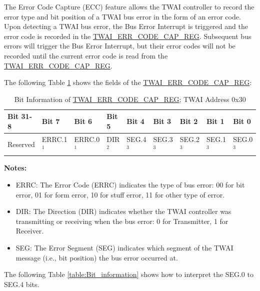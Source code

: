 \documentclass[main\_\_EN.tex]{subfiles}
\begin{document}
The Error Code Capture (ECC) feature allows the TWAI controller to record the error type and bit position of a TWAI bus error in the form of an error code. Upon detecting a TWAI bus error, the Bus Error Interrupt is triggered and the error code is recorded in the \hyperref[regdesc:TWAIERRCODECAPREG]{TWAI\_ERR\_CODE\_CAP\_REG}. Subsequent bus errors will trigger the Bus Error Interrupt, but their error codes will not be recorded until the current error code is read from the \hyperref[regdesc:TWAIERRCODECAPREG]{TWAI\_ERR\_CODE\_CAP\_REG}.

The following Table \ref{table:ECC_REG1} shows the fields of the \hyperref[regdesc:TWAIERRCODECAPREG]{TWAI\_ERR\_CODE\_CAP\_REG}:

\begin{longtable}[c]{|p{1.4cm}|p{1.4cm}|p{1.4cm}|p{1.4cm}|p{1.4cm}|p{1.4cm}|p{1.4cm}|p{1.4cm}|p{1.4cm}|}
    \caption{Bit Information of \hyperref[regdesc:TWAIERRCODECAPREG]{TWAI\_ERR\_CODE\_CAP\_REG}; TWAI Address 0x30}
    \label{table:ECC_REG1}\\
    \hline
    \rowcolor{lightgray}
    Bit 31-8 & Bit 7 & Bit 6 & Bit 5 & Bit 4 & Bit 3 & Bit 2 & Bit 1 & Bit 0\\\hline
    Reserved & ERRC.1$^1$ & ERRC.0$^1$ & DIR$^2$ & SEG.4$^3$ & SEG.3$^3$ & SEG.2$^3$ & SEG.1$^3$ & SEG.0$^3$\\
    \hline
\end{longtable}
\vspace{-1.5em}
{\bfseries Notes:}\\
\begin{itemize}
    \item ERRC: The Error Code (ERRC) indicates the type of bus error: 00 for bit error, 01 for form error, 10 for stuff error, 11 for other type of error.
    \item DIR: The Direction (DIR) indicates whether the TWAI controller was transmitting or receiving when the bus error: 0 for Transmitter, 1 for Receiver.
    \item SEG: The Error Segment (SEG) indicates which segment of the TWAI message (i.e., bit position) the bus error occurred at.
\end{itemize}

The following Table \ref{table:Bit_information} shows how to interpret the SEG.0 to SEG.4 bits.
\end{document}
